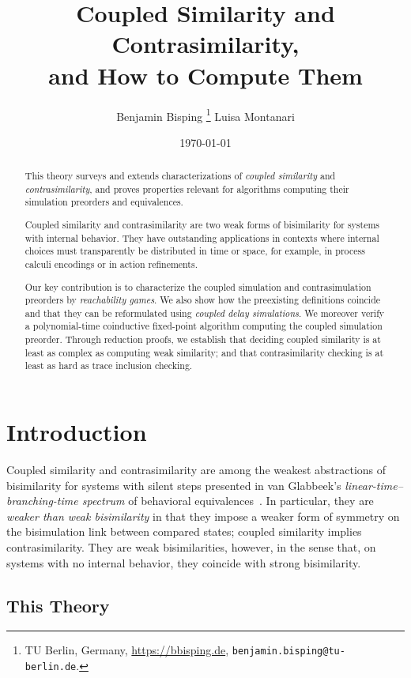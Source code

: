 \documentclass[10pt,a4paper]{article}
\title{ \textbf{Coupled Similarity and Contrasimilarity,} \\ \Large and How to Compute Them }
\author{ Benjamin Bisping%
  \footnote{TU Berlin, Germany,
    \url{https://bbisping.de}, \texttt{benjamin.bisping@tu-berlin.de}.}%
  \qquad Luisa Montanari%
 }
\date{\today}
\begin{document}
\maketitle

\begin{abstract}
\noindent
This theory surveys and extends characterizations of \emph{coupled similarity} and \emph{contrasimilarity},
and proves properties relevant for algorithms computing their simulation preorders and equivalences.

Coupled similarity and contrasimilarity are two weak forms of bisimilarity for systems with
internal behavior.
They have outstanding applications in contexts where internal choices must transparently be
distributed in time or space, for example, in process calculi encodings or in action refinements.

Our key contribution is to characterize the coupled simulation and contrasimulation preorders by \emph{reachability games}.
We also show how the preexisting definitions coincide and that they can be reformulated using \emph{coupled delay simulations}.
We moreover verify a polynomial-time coinductive fixed-point algorithm computing the coupled simulation preorder.
Through reduction proofs, we establish that deciding coupled similarity is at least as complex
as computing weak similarity; and that contrasimilarity checking is at least as hard as trace inclusion
checking.
\end{abstract}

\tableofcontents

\section{Introduction}

Coupled similarity and contrasimilarity are among the weakest abstractions of bisimilarity for systems
with silent steps presented in van Glabbeek's \emph{linear-time--branching-time spectrum} of behavioral
equivalences~\cite{glabbeek1993ltbt}.
In particular, they are \emph{weaker than weak bisimilarity} in that they impose a weaker form of
symmetry on the bisimulation link between compared states; coupled similarity implies
contrasimilarity. They are weak bisimilarities, however, in the sense
that, on systems with no internal behavior, they coincide with strong bisimilarity.

\subsection{This Theory}
\end{document}
